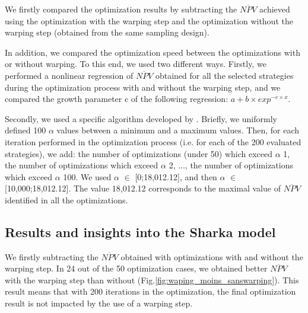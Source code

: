 
We firstly compared the optimization results by subtracting the $\overline{NPV}$ achieved using the optimization with the warping step and the optimization without the warping step (obtained from the same sampling design). 

In addition, we compared the optimization speed between the optimizations with or without warping. To this end, we used two different ways. 
Firstly, we performed a nonlinear regression of $\overline{NPV}$ obtained for all the selected strategies during the optimization process with 
and without the warping step, and we compared the growth parameter c of the following regression:
$a+b \times exp^{-c\times x}$.

Secondly, we used a specific algorithm developed by . Briefly, we uniformly defined 100 $\alpha$ values between a minimum and a maximum values. 
Then, for each iteration performed in the optimization process (i.e. for each of the 200 evaluated strategies), we add: 
the number of optimizations (under 50) which exceed $\alpha$ 1, the number of optimizations which exceed $\alpha$ 2, ..., 
the number of optimizations which exceed $\alpha$ 100. We used $\alpha$ $\in$ [0;18,012.12], and then $\alpha$ $\in$ [10,000;18,012.12]. 
The value 18,012.12 corresponds to the maximal value of $\overline{NPV}$ identified in all the optimizations.

\subsection{Results and insights into the Sharka model}

We firstly subtracting the $\overline{NPV}$ obtained with optimizations with and without the warping step. 
In 24 out of the 50 optimization cases, we obtained better $\overline{NPV}$ with the warping step than without (Fig.\ref{fig:waping_moins_sanswarping}). 
This result means that with 200 iterations in the optimization, the final optimization result is not impacted by the use of a warping step.

